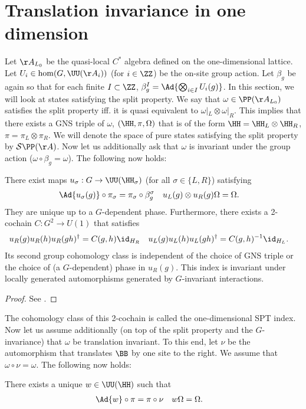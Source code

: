 \section{Translation invariance in one dimension}\label{sec:OneDimensionalIndices}
Let $\AA_{L_0}$ be the quasi-local $C^*$ algebra defined on the one-dimensional lattice. Let $U_i\in\hom(G,\UU(\AA_i))$ (for $i\in\ZZ$) be the on-site group action. Let $\beta_g$ be again so that for each finite $I\subset \ZZ$, $\beta_g^I=\Ad{\bigotimes_{i\in I}U_i(g)}$. In this section, we will look at states satisfying the split property. We say that $\omega\in\PP(\AA_{L_0})$ satisfies the split property iff. it is quasi equivalent to $\omega|_{L}\otimes\omega|_{R}$. This implies that there exists a GNS triple of $\omega$, $(\HH,\pi,\Omega)$ that is of the form $\HH=\HH_L\otimes\HH_R$, $\pi=\pi_L\otimes\pi_R$. We will denote the space of pure states satisfying the split property by $\mathcal{S}\PP(\AA)$. Now let us additionally ask that $\omega$ is invariant under the group action ($\omega\circ\beta_g=\omega$). The following now holds:
\begin{lemma}
	There exist maps $u_\sigma:G\rightarrow \UU(\HH_\sigma)$ (for all $\sigma\in\{L,R\}$) satisfying
	\begin{align}
		\Ad{u_\sigma(g)}\circ\pi_\sigma&=\pi_\sigma\circ\beta_g^\sigma&u_L(g)\otimes u_R(g)\Omega&=\Omega.
	\end{align}
	They are unique up to a $G$-dependent phase. Furthermore, there exists a 2-cochain $C:G^2\rightarrow U(1)$ that satisfies
	\begin{align}
		u_R(g)u_R(h)u_R(gh)^{\dagger}&=C(g,h)\id_{H_R}&u_L(g)u_L(h)u_L(gh)^{\dagger}&=C(g,h)^{-1}\id_{H_L}.
	\end{align}
	Its second group cohomology class is independent of the choice of GNS triple or the choice of (a $G$-dependent) phase in $u_R(g)$. This index is invariant under locally generated automorphisms generated by $G$-invariant interactions.
\end{lemma}
\begin{proof}
	See \cite{ogata2021classification}.
\end{proof}
The cohomology class of this 2-cochain is called the one-dimensional SPT index. Now let us assume additionally (on top of the split property and the $G$-invariance) that $\omega$ be translation invariant. To this end, let $\nu$ be the automorphism that translates $\BB$ by one site to the right. We assume that $\omega\circ\nu=\omega$. The following now holds:
\begin{lemma}
	There exists a unique $w\in\UU(\HH)$ such that
	\begin{align}
		\Ad{w}\circ\pi&=\pi\circ\nu&w\Omega&=\Omega.
	\end{align}
\end{lemma}
